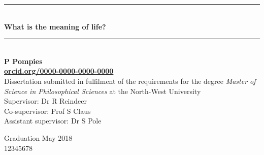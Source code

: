 
\begin{titlepage}
\begingroup
{\selectfont 


\vspace*{3.5cm}
\newcommand{\HRule}{\rule{\linewidth}{0.0mm}} %
\center %

\HRule \\[0.5cm]
{\fontsize{32}{10}\selectfont \bfseries What is the meaning of life?}\\[0.2cm] 
\HRule \\[1.25cm]

{\huge \bfseries P Pompies} \\[0.2cm]
{\huge \bfseries
\href{https://orcid.org/0000-0000-0000-0000}{orcid.org/0000-0000-0000-0000}}
\\[2.20cm]

{\LARGE Dissertation submitted in fulfilment of the requirements for
the degree {\color{cyan!85} \textit{Master of Science in Philosophical
Sciences}} at the North-West University}\\[1.70cm]

\centering
\hspace{11.0mm} \LARGE Supervisor:    \hspace{19.0mm} Dr R Reindeer \\
\hspace{6.0mm}  \LARGE Co-supervisor: \hspace{11.0mm} Prof S Claus \\
\LARGE Assistant supervisor: Dr S Pole \\[1.5cm]

\raggedright
\LARGE Graduation May 2018\\
\LARGE 12345678\\

}
\endgroup
\end{titlepage}

\restoregeometry
